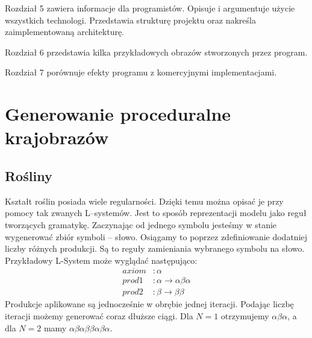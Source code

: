 \documentclass[inz,longabstract]{iithesis}
\begin{document}
    Rozdział 5 zawiera informacje dla programistów. Opisuje i argumentuje użycie wszystkich technologi. Przedstawia strukturę projektu oraz nakreśla zaimplementowaną architekturę.
    
    Rozdział 6 przedstawia kilka przykładowych obrazów stworzonych przez program. 
    
    Rozdział 7 porównuje efekty programu z komercyjnymi implementacjami.
    
    
    
\chapter{Generowanie proceduralne krajobrazów}

    \section{Rośliny}
        Kształt roślin posiada wiele regularności. Dzięki temu można opisać je przy pomocy tak zwanych L--systemów. Jest to sposób reprezentacji modelu jako reguł tworzących gramatykę. Zaczynając od jednego symbolu jesteśmy w stanie wygenerować zbiór symboli -- słowo. Osiągamy to poprzez zdefiniowanie dodatniej liczby różnych produkcji. Są to reguły zamieniania wybranego symbolu na słowo. Przykładowy L-System może wyglądać następująco:
        \begin{align*}
            axiom &: \alpha \\
            prod1 &: \alpha \rightarrow \alpha\beta\alpha \\
            prod2 &: \beta \rightarrow \beta\beta
        \end{align*}
        Produkcje aplikowane są jednocześnie w obrębie jednej iteracji. Podając liczbę iteracji możemy generować coraz dłuższe ciągi. Dla $N = 1$ otrzymujemy $\alpha\beta\alpha$, a dla $N = 2$ mamy $\alpha\beta\alpha\beta\beta\alpha\beta\alpha$.
        
\end{document}
